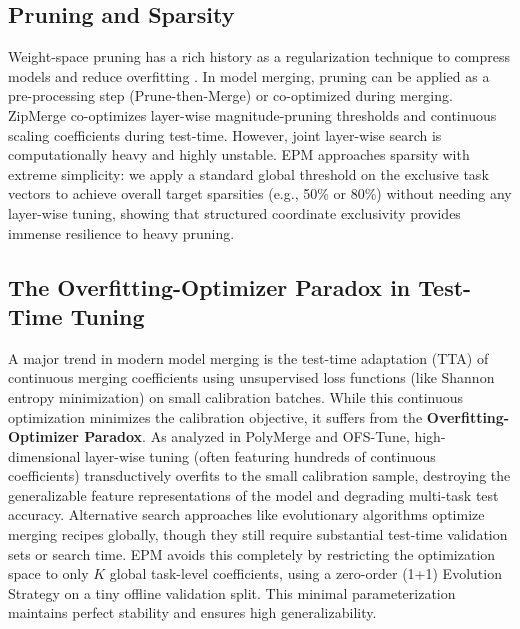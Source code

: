 \subsection{Pruning and Sparsity}
Weight-space pruning has a rich history as a regularization technique to compress models and reduce overfitting \cite{han2015learning, frankle2018lottery}. In model merging, pruning can be applied as a pre-processing step (Prune-then-Merge) or co-optimized during merging. ZipMerge co-optimizes layer-wise magnitude-pruning thresholds and continuous scaling coefficients during test-time. However, joint layer-wise search is computationally heavy and highly unstable. EPM approaches sparsity with extreme simplicity: we apply a standard global threshold on the exclusive task vectors to achieve overall target sparsities (e.g., 50\% or 80\%) without needing any layer-wise tuning, showing that structured coordinate exclusivity provides immense resilience to heavy pruning.

\subsection{The Overfitting-Optimizer Paradox in Test-Time Tuning}
A major trend in modern model merging is the test-time adaptation (TTA) of continuous merging coefficients using unsupervised loss functions (like Shannon entropy minimization) on small calibration batches. While this continuous optimization minimizes the calibration objective, it suffers from the \textbf{Overfitting-Optimizer Paradox}. As analyzed in PolyMerge and OFS-Tune, high-dimensional layer-wise tuning (often featuring hundreds of continuous coefficients) transductively overfits to the small calibration sample, destroying the generalizable feature representations of the model and degrading multi-task test accuracy. Alternative search approaches like evolutionary algorithms \cite{akiba2024evolutionary} optimize merging recipes globally, though they still require substantial test-time validation sets or search time. EPM avoids this completely by restricting the optimization space to only $K$ global task-level coefficients, using a zero-order (1+1) Evolution Strategy on a tiny offline validation split. This minimal parameterization maintains perfect stability and ensures high generalizability.
